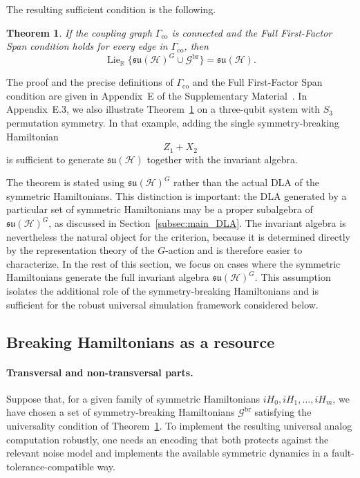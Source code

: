 \documentclass[10pt,twocolumn,superscriptaddress,aps,amsmath,amssymb,citeautoscript,floatfix,prx]{revtex4-2}
\newcounter{alg}
\newtheorem{theorem}{Theorem}
\theoremstyle{plain}
\theoremstyle{plain}
\theoremstyle{plain}
\theoremstyle{plain}
\theoremstyle{plain}
\theoremstyle{plain}
\begin{document}
The resulting sufficient condition is the following.

\begin{theorem}\label{thm:breakers_suff_cond}
If the coupling graph $\Gamma_{\mathrm{co}}$ is connected and the Full First-Factor Span condition holds for every edge in $\Gamma_{\mathrm{co}}$, then
$$
\operatorname{Lie}_{\mathbb R}
\{\mathfrak{su}(\mathcal H)^G\cup\mathcal G^{\mathrm{br}}\}
=
\mathfrak{su}(\mathcal H).
$$
\end{theorem}

The proof and the precise definitions of $\Gamma_{\mathrm{co}}$ and the Full First-Factor Span condition are given in Appendix~E of the Supplementary Material~\cite{SuppMat}. In Appendix~E.3, we also illustrate Theorem~\ref{thm:breakers_suff_cond} on a three-qubit system with $S_3$ permutation symmetry. In that example, adding the single symmetry-breaking Hamiltonian
$$
Z_1+X_2
$$
is sufficient to generate $\mathfrak{su}(\mathcal H)$ together with the invariant algebra.

The theorem is stated using $\mathfrak{su}(\mathcal H)^G$ rather than the actual DLA of the symmetric Hamiltonians. This distinction is important: the DLA generated by a particular set of symmetric Hamiltonians may be a proper subalgebra of $\mathfrak{su}(\mathcal H)^G$, as discussed in Section~\ref{subsec:main_DLA}. The invariant algebra is nevertheless the natural object for the criterion, because it is determined directly by the representation theory of the $G$-action and is therefore easier to characterize. In the rest of this section, we focus on cases where the symmetric Hamiltonians generate the full invariant algebra $\mathfrak{su}(\mathcal H)^G$. This assumption isolates the additional role of the symmetry-breaking Hamiltonians and is sufficient for the robust universal simulation framework considered below.

\subsection{Breaking Hamiltonians as a resource}\label{subsec:main_H_br_resource}

\paragraph{Transversal and non-transversal parts.}

Suppose that, for a given family of symmetric Hamiltonians ${iH_0,iH_1,\ldots,iH_m}$, we have chosen a set of symmetry-breaking Hamiltonians $\mathcal G^{\mathrm{br}}$ satisfying the universality condition of Theorem~\ref{thm:breakers_suff_cond}. To implement the resulting universal analog computation robustly, one needs an encoding that both protects against the relevant noise model and implements the available symmetric dynamics in a fault-tolerance-compatible way.
\end{document}
